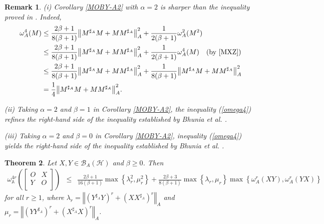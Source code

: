 \documentclass{article}
\newcommand{\bra}[1]{\left(#1\right)}
\newcommand{\normA}[1]{{\left\Vert#1\right\Vert}_{A}}
\newcommand{\set}[1]{\left\{#1\right\}}
\newcommand {\A}{\mathbb{A}}
\newcommand {\Ma}{M^{\sharp_{A}}}
\newcommand {\h}{\mathcal{H}}
\newcommand {\Xa}{X^{\sharp_{A}}}
\renewcommand {\b}{\mathcal{B}}
\newcommand {\Ya}{Y^{\sharp_{A}}}
\newtheorem{theorem}{Theorem}[section]
\newtheorem{remark}[theorem]{Remark}
\begin{document}
\begin{remark}
(i) Corollary \ref{MOBY-A2} with $\alpha=2$ is sharper than the inequality proved in \cite[Theorem 2.10]{Zamani-2}. Indeed,
\begin{align*}
  \omega_A^4(M) &\leq \frac{2\beta+1}{8(\beta+1)}\normA{\Ma M+M\Ma}^2 + \frac{1}{2(\beta+1)}\omega_A^2(M^2) \\
                &\leq \frac{2\beta+1}{8(\beta+1)}\normA{\Ma M+M\Ma}^2 + \frac{1}{2(\beta+1)}\omega_A^4(M) \quad \text{(by \cite[Proposition 3.10]{MXZ})} \\
                &\leq \frac{2\beta+1}{8(\beta+1)}\normA{\Ma M+M\Ma}^2 + \frac{1}{8(\beta+1)}\normA{\Ma M+M\Ma}^2 \\
                &= \frac{1}{4}\normA{\Ma M+M\Ma}^2.
\end{align*}

(ii) Taking $\alpha=2$ and $\beta=1$ in Corollary \ref{MOBY-A2}, the inequality (\ref{omega4}) refines the right-hand side of the inequality established by Bhunia et al. \cite[Corollary 2.10]{BPN}.

(iii) Taking $\alpha = 2$ and $\beta = 0$ in Corollary \ref{MOBY-A2}, inequality (\ref{omega4}) yields the right-hand side of the inequality established by Bhunia et al. \cite[Corollary 2.10]{BPN}.
\end{remark}
\begin{theorem}\label{Ramadan1} Let $X,Y\in\b_A(\h)$ and $\beta\geq 0$. Then
\begin{eqnarray*}
  \omega_{\A}^{4r}\bra{\begin{bmatrix} O& X\\ Y& O \\\end{bmatrix}}&\leq& \frac{2\beta+1}{16(\beta+1)} \max\set{\lambda_r^2,\mu_r^2}+\frac{2\beta+3}{8(\beta+1)}\max\set{\lambda_r,\mu_r}\max\set{\omega_A^r(XY),\omega_A^r(YX)}
\end{eqnarray*}
for all $r\geq 1$, where  $\lambda_r=\normA{\bra{\Ya Y}^r+\bra{X\Xa}^r}$ and  $\mu_r=\normA{\bra{Y\Ya }^r+\bra{\Xa X}^r}$.
\end{theorem}
\end{document}
